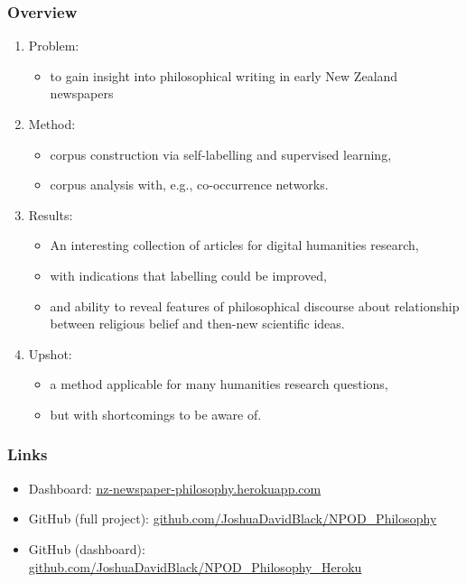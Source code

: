 \documentclass[10pt, compress]{beamer}
\begin{document}
\begin{frame}
	\frametitle{Overview}

  \pause

  \begin{enumerate}[<+- | alert@+>]
  \item Problem:
	\begin{itemize}
		\item to gain insight into philosophical writing in early New Zealand newspapers
	\end{itemize}
	\item Method:
	\begin{itemize}
		\item corpus construction via self-labelling and supervised learning,
		\item corpus analysis with, e.g., co-occurrence networks.
	\end{itemize}
	\item Results:
	\begin{itemize}
		\item An interesting collection of articles for digital humanities research,
		\item with indications that labelling could be improved,
		\item and ability to reveal features of philosophical discourse about relationship between religious belief and then-new scientific ideas.
	\end{itemize}
	\item Upshot:
	\begin{itemize}
		\item a method applicable for many humanities research questions,
		\item but with shortcomings to be aware of.
	\end{itemize}
	\end{enumerate}

\end{frame}

\begin{frame}
	\frametitle{Links}

  \begin{itemize}
		\item Dashboard: \url{nz-newspaper-philosophy.herokuapp.com}
		\item GitHub (full project): \url{github.com/JoshuaDavidBlack/NPOD_Philosophy}
		\item GitHub (dashboard): \url{github.com/JoshuaDavidBlack/NPOD_Philosophy_Heroku}
	\end{itemize}

\end{frame}
\end{document}
